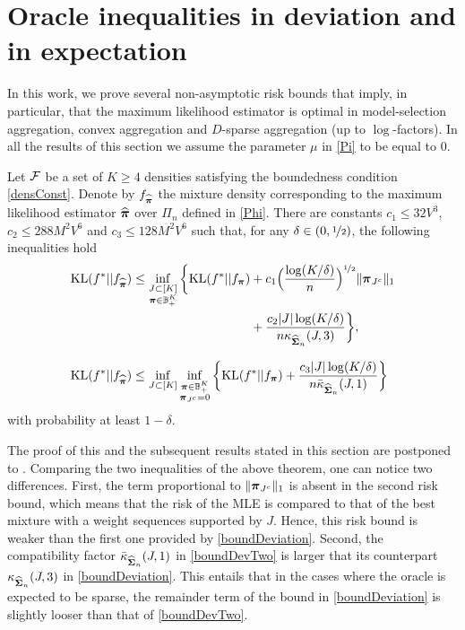 \section[Oracles inequalities]{Oracle inequalities in deviation and in expectation} %
\label{sec:main_results}

In this work, we prove several non-asymptotic risk bounds that
imply, in particular, that the maximum likelihood estimator is optimal in model-selection aggregation,
convex aggregation and $D$-sparse aggregation (up to $\log$-factors). In all the results of this section
we assume the parameter $\mu$ in \eqref{Pi} to be equal to $0$.
\begin{theorem}
	\label{maintheo1}
	Let $\cal F$ be a set of $K\ge 4$ densities satisfying the boundedness condition \eqref{densConst}.
	Denote by $f_{\widehat{\boldsymbol \pi}}$ the mixture density corresponding to the maximum likelihood estimator
	$\widehat{\boldsymbol \pi}$ over $\Pi_n$ defined in \eqref{Phi}. There are constants $c_1\le 32V^3$,
	$c_2\le 288 M^2V^6$ and $c_3\le 128 M^2V^6$ such that, for any $\delta \in (0,\nicefrac12)$, the following
	inequalities hold
	\begin{align}
	\KL(f^*|| f_{\hat\bpi}) &\leq \inf_{\substack{J\subset [K]\\\bpi \in \BB_+^K}} 
	\bigg\{ \KL(f^*|| f_{\bpi}) + c_1\Big(\frac{\log(K/\delta)}{n}\Big)^{\nicefrac12} \|\bpi_{J^c}\|_1\nonumber\\
	&\phantom{{}\leq \inf_{\substack{J\subset [K]\\\bpi \in \BB_+^K}} 
	\bigg\{ \KL(f^*|| f_{\bpi})}+\frac{c_2|J|\log(K/\delta)}{n\kappa_{\hat\bSigma_n}(J,3)} \bigg\},\label{boundDeviation}\\
	\KL(f^*|| f_{\hat\bpi}) &\leq \inf_{J\subset [K]}\inf_{\substack{\bpi \in \BB_+^K\\ \bpi_{J^c}=0}}
	\bigg\{ \KL(f^*|| f_{\bpi}) +\frac{c_3|J|\log(K/\delta)}{n\bar\kappa_{\hat\bSigma_n}(J,1)}
	\bigg\} \label{boundDevTwo}
	\end{align}
	with probability at least $1-\delta$.
\end{theorem}%

The proof of this and the subsequent results stated in this section are postponed to .
Comparing the two inequalities of the above theorem, one can notice two differences. First, the term
proportional to $\|\boldsymbol \pi_{J^c}\|_1$  is absent in the second risk bound, which means that
the risk of the MLE is compared to that of the best mixture with a weight sequences supported by $J$.
Hence, this risk bound is weaker than the first one provided by \eqref{boundDeviation}. Second,
the compatibility factor $\bar\kappa_{\widehat{\boldsymbol\Sigma}_n}(J,1)$ in \eqref{boundDevTwo} is larger that
its counterpart $\kappa_{\widehat{\boldsymbol\Sigma}_n}(J,3)$ in \eqref{boundDeviation}. This entails that in the cases
where the oracle is expected to be sparse, the remainder term of the bound in \eqref{boundDeviation}
is slightly looser than that of \eqref{boundDevTwo}.



